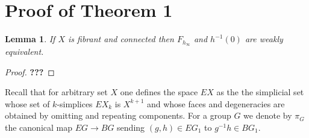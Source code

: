 \documentclass[oneside, 12pt]{amsart}
\theoremstyle{plain}
\numberwithin{equation}{section}
\newtheorem{lemma}{Lemma}
\numberwithin{lemma}{section}
\newtheorem{cor}[lemma]{Corollary}
\theoremstyle{remark}
\theoremstyle{definition}
\newcommand{\catname}[1]{{\normalfont\textbf{#1}}}
\DeclareMathOperator{\HH}{H}
\DeclareMathOperator{\Ker}{Ker}
\newcommand{\ZZ}{\mathbb{Z}}
\begin{document}
\begin{comment}
 To construct the inverse map $\psi\colon H_n(\Lambda^2G) \to HQ_n(G)$ it suffices to check that $c_n(u, u) = 1$.
 But this follows from~\eqref{H00}--\eqref{H0}:
 \[c_n(u, u) = c_n(u, u^{-1}) = h_{nj}(u) \cdot h_{nj}(u^{-1}) \cdot h_{nj}(1)^{-1} = 1. \qedhere\] 
\end{proof}

Thus we obtain the following result.
\begin{cor}
  For $n\geq 3$ the group $Q_n(G)$ is a central extension of $G \wr S_n$ isomorphic to $H_n(\Lambda^2G)\rtimes S_n$.
  The kernel of $\mu$ is isomorphic to $\HH_2(G, \mathbb{Z})$.  
\end{cor}
\end{comment}


\section{Proof of Theorem 1} \label{sec:main}
\begin{lemma} \label{lm:weak-equiv}If $X$ is fibrant and connected then $F_{h_\infty}$ and $h^{-1}(0)$ are weakly equivalent. \end{lemma}
\begin{proof}
 {\bf ???}
\end{proof}

\begin{comment}
From the proof of~\cite[Lemma~10.1]{Po17} it follows that the following square of abelian groups is cocartesian in the case $Y$ is fibrant and connected.
\begin{equation} \xymatrix{ \ZZ[\catname{sSets}(X, Y)] \ar[r]  \ar@{->>}_{\alpha}[d] & \catname{sSets}(X, A(Y)) \ar@{->>}_{\beta}[d]  \\
                            \ZZ[\catname{hsSets}(X, Y)] \ar[r] & \catname{hsSets}(X, A(Y))  } 
\label{eq:podkorytov-square} \end{equation}
Here both $\alpha$, $\beta$ map each morphism of simplicial sets to the corresponding class in the homotopy category.
The fact that the above square is cocartesian is equivalent to the surjectivity of the map $\Ker(\alpha)\twoheadrightarrow\Ker(\beta)$.

\begin{equation} \xymatrix{                            & X  \ar[d]^\gamma             &     \\
                            h^{-1}(0)  \ar@{^{(}->}[r] & Y^\infty  \ar[r]^{h_\infty}  & A(Y) } \end{equation}
\end{comment} 
Recall that for arbitrary set $X$ one defines the space $EX$ as the the simplicial set whose set of $k$-simplices $EX_k$
 is $X^{k+1}$ and whose faces and degeneracies are obtained by omitting and repeating components. 
For a group $G$ we denote by $\pi_G$ the canonical map $EG \to BG$ sending $(g, h) \in EG_1$ to $g^{-1}h \in BG_1$.
 
\end{document}

